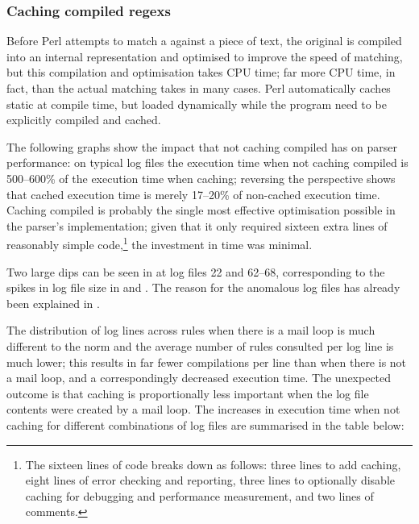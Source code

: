 \subsubsection{Caching compiled regexs}

\label{Caching compiled regexes}

Before Perl attempts to match a \regex{} against a piece of text, the
original \regex{} is compiled into an internal representation and optimised
to improve the speed of matching, but this compilation and optimisation
takes CPU time; far more CPU time, in fact, than the actual matching takes
in many cases.  Perl automatically caches static \regexes{} at compile
time, but \regexes{} loaded dynamically while the program need to be
explicitly compiled and cached.  

The following graphs show the impact that not caching compiled \regexes{}
has on parser performance: on typical log files the execution time when not
caching compiled \regexes{} is 500--600\% of the execution time when
caching; reversing the perspective shows that cached execution time is
merely 17--20\% of non-cached execution time.  Caching compiled \regexes{}
is probably the single most effective optimisation possible in the parser's
implementation; given that it only required sixteen extra lines of
reasonably simple code,\footnote{The sixteen lines of code breaks down as
follows: three lines to add caching, eight lines of error checking and
reporting, three lines to optionally disable caching for debugging and
performance measurement, and two lines of comments.} the investment in time
was minimal.



Two large dips can be seen in  at log files 22 and 62--68, corresponding to the spikes in
log file size in  and .  The
reason for the anomalous log files has already been explained in
.

The distribution of log lines across rules when there is a mail loop is
much different to the norm and the average number of rules consulted per
log line is much lower; this results in far fewer \regex{} compilations per
line than when there is not a mail loop, and a correspondingly decreased
execution time.  The unexpected outcome is that caching \regexes{} is
proportionally less important when the log file contents were created by a
mail loop.  The increases in execution time when not caching \regexes{} for
different combinations of log files are summarised in the table below:

